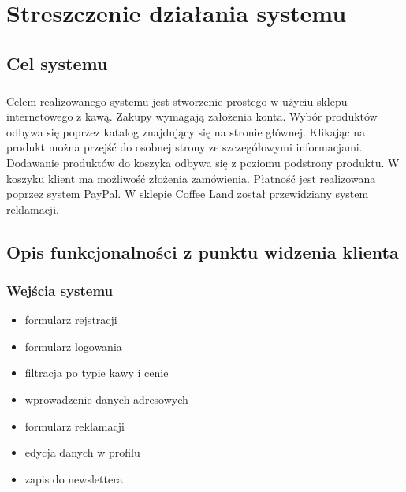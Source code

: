 \documentclass[12pt]{report}
\begin{document}
	
	\newpage
	
	\tableofcontents

	\setcounter{chapter}{0}	
	\setcounter{section}{0}	
	

	\chapter{Streszczenie działania systemu}
	
	\section{Cel systemu}
	
		\paragraph{}
		
		Celem realizowanego systemu jest stworzenie prostego w użyciu sklepu internetowego z kawą. Zakupy wymagają założenia konta. Wybór produktów odbywa się poprzez katalog znajdujący się na stronie głównej. Klikając na produkt można przejść do osobnej strony ze szczegółowymi informacjami. Dodawanie produktów do koszyka odbywa się z poziomu podstrony produktu. W koszyku klient ma możliwość złożenia zamówienia. Płatność jest realizowana poprzez system PayPal. W sklepie Coffee Land został przewidziany system reklamacji.
	
	\section{Opis funkcjonalności z punktu widzenia klienta}
		
		\subsection{Wejścia systemu}
					\begin{itemize}
						\item formularz rejstracji 
						\item formularz logowania
						\item filtracja po typie kawy i cenie
						\item wprowadzenie danych adresowych
						\item formularz reklamacji
						\item edycja danych w profilu
						\item zapis do newslettera
					\end{itemize}
\end{document}
